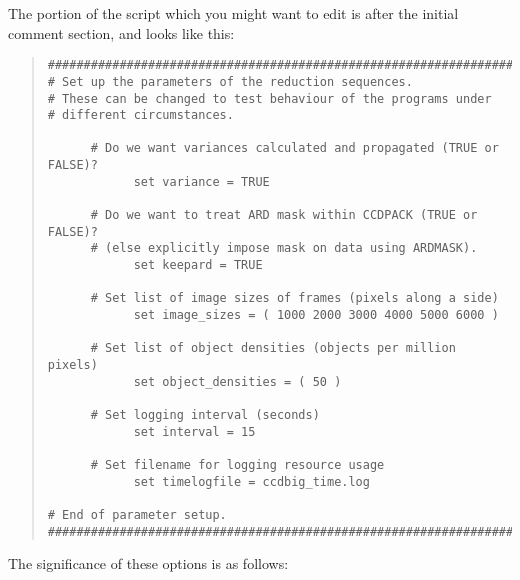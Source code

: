 The portion of the script which you might want to edit 
is after the initial comment section, and looks like this:
\begin{quote}
\begin{verbatim}
###################################################################
# Set up the parameters of the reduction sequences.
# These can be changed to test behaviour of the programs under
# different circumstances.

      # Do we want variances calculated and propagated (TRUE or FALSE)?
            set variance = TRUE

      # Do we want to treat ARD mask within CCDPACK (TRUE or FALSE)?
      # (else explicitly impose mask on data using ARDMASK).
            set keepard = TRUE

      # Set list of image sizes of frames (pixels along a side)
            set image_sizes = ( 1000 2000 3000 4000 5000 6000 )

      # Set list of object densities (objects per million pixels)
            set object_densities = ( 50 )

      # Set logging interval (seconds)
            set interval = 15

      # Set filename for logging resource usage
            set timelogfile = ccdbig_time.log

# End of parameter setup.
###################################################################
\end{verbatim}
\end{quote}
The significance of these options is as follows:
